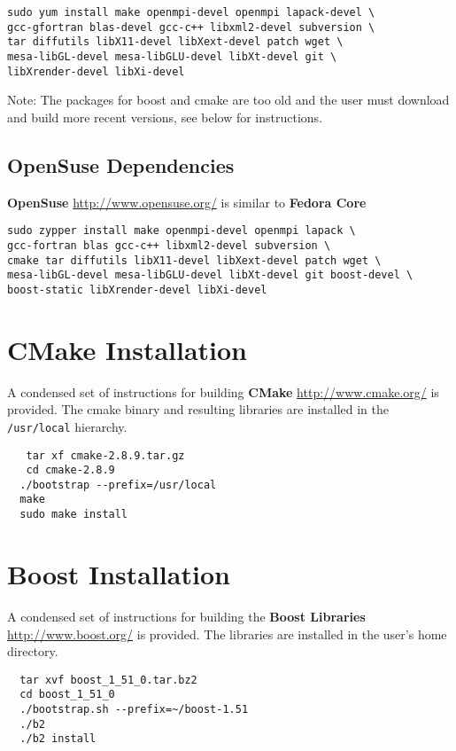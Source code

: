 \documentclass[11pt,fleqn]{book} %
\begin{document}
\begin{lstlisting}
sudo yum install make openmpi-devel openmpi lapack-devel \
gcc-gfortran blas-devel gcc-c++ libxml2-devel subversion \ 
tar diffutils libX11-devel libXext-devel patch wget \
mesa-libGL-devel mesa-libGLU-devel libXt-devel git \
libXrender-devel libXi-devel
\end{lstlisting} 

Note:  The packages for boost and cmake are too old and the user must
download and build more recent versions, see below for instructions.

\section{OpenSuse  Dependencies}

\textbf{OpenSuse} \url{http://www.opensuse.org/} is similar to
\textbf{Fedora Core}

\begin{lstlisting}
sudo zypper install make openmpi-devel openmpi lapack \
gcc-fortran blas gcc-c++ libxml2-devel subversion \ 
cmake tar diffutils libX11-devel libXext-devel patch wget \
mesa-libGL-devel mesa-libGLU-devel libXt-devel git boost-devel \
boost-static libXrender-devel libXi-devel
\end{lstlisting} 

\chapter{CMake Installation}

A condensed set of instructions for building \textbf{CMake}
\url{http://www.cmake.org/} is provided.  The cmake binary and
resulting libraries are installed in the \texttt{/usr/local} hierarchy.

\begin{lstlisting}
   tar xf cmake-2.8.9.tar.gz 
   cd cmake-2.8.9
  ./bootstrap --prefix=/usr/local
  make
  sudo make install
\end{lstlisting}

\chapter{Boost Installation}

A condensed set of instructions for building the \textbf{Boost
  Libraries} \url{http://www.boost.org/} is provided.  The libraries
are installed in the user's home directory.

\begin{lstlisting}
  tar xvf boost_1_51_0.tar.bz2 
  cd boost_1_51_0
  ./bootstrap.sh --prefix=~/boost-1.51
  ./b2
  ./b2 install
\end{lstlisting}
\end{document}
